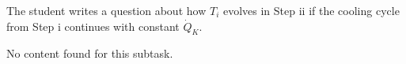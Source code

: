 The student writes a question about how \( T_i \) evolves in Step ii if the cooling cycle from Step i continues with constant \( \dot{Q}_K \).  

No content found for this subtask.